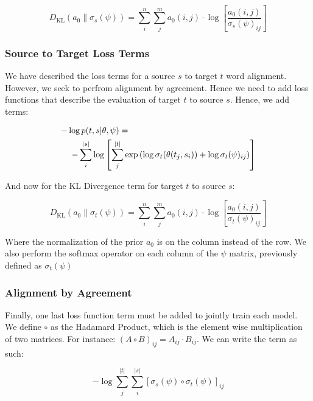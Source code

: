 \documentclass[twoside,twocolumn]{article}
\begin{document}
\begin{equation}
  D_{\mathrm{KL}} ( a_0 \| \sigma_s(\psi) ) = \sum_i^n \sum_j^m a_0(i, j) \cdot \log \left[ \frac{a_0(i, j)}{\sigma_s(\psi)_{ij}} \right]
\end{equation}



\subsubsection{Source to Target Loss Terms}
We have described the loss terms for a source $s$ to target $t$ word alignment. However, we seek to perfrom alignment by agreement. Hence we need to add loss functions that describe the evaluation of target $t$ to source $s$. Hence, we add terms:

\begin{equation}
  \centering
  \begin{split}
  -\log  p(t & , s | \theta, \psi) = \\
  - \sum_i^{|s|} & \log \left[ \sum_j^{|t|} \exp \left( \log \sigma_t(\theta(t_j, s_i)) + \log \sigma_t(\psi)_{ij} \right) \right]
\end{split}
\end{equation}

And now for the KL Divergence term for target $t$ to source $s$:

\begin{equation}
  D_{\mathrm{KL}} ( a_0 \| \sigma_t(\psi) ) = \sum_i^n \sum_j^m a_0(i, j) \cdot \log \left[ \frac{a_0(i, j)}{\sigma_t(\psi)_{ij}} \right]
\end{equation}

Where the normalization of the prior $a_0$ is on the column instead of the row. We also perform the softmax operator on each column of the $\psi$ matrix, previously defined as $\sigma_t(\psi)$

\subsubsection{Alignment by Agreement}
Finally, one last loss function term must be added to jointly train each model. We define $\circ$ as the Hadamard Product, which is the element wise multiplication of two matrices. For instance: $(A \circ B)_{ij} = A_{ij} \cdot B_{ij}$. We can write the term as such:

\begin{equation}
  -\log \sum_j^{|t|} \sum_i^{|s|} \left[ \sigma_s(\psi) \circ \sigma_t(\psi) \right]_{ij}
\end{equation}
\end{document}
